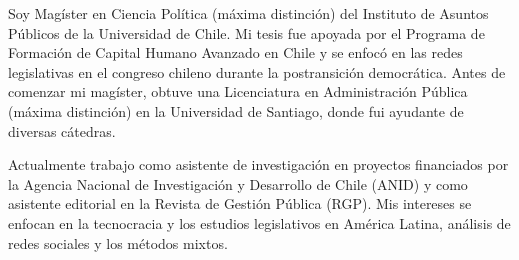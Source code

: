 




\par{Soy Magíster en Ciencia Política (máxima distinción) del Instituto de Asuntos Públicos de la Universidad de Chile. Mi tesis fue apoyada por el Programa de Formación de Capital Humano Avanzado en Chile y se enfocó en las redes legislativas en el congreso chileno durante la postransición democrática. Antes de comenzar mi magíster, obtuve una Licenciatura en Administración Pública (máxima distinción) en la Universidad de Santiago, donde fui ayudante de diversas cátedras.

Actualmente trabajo como asistente de investigación en proyectos financiados por la Agencia Nacional de Investigación y Desarrollo de Chile (ANID) y como asistente editorial en la Revista de Gestión Pública (RGP). Mis intereses se enfocan en la tecnocracia y los estudios legislativos en América Latina, análisis de redes sociales y los métodos mixtos.}\\
